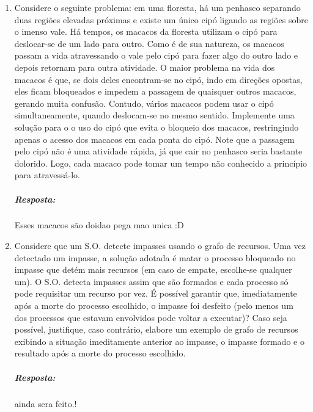 \documentclass[12pt]{article}
\begin{document}
\begin{enumerate}
 
\item
Considere o seguinte problema: em uma floresta, há um penhasco
separando duas regiões elevadas próximas e existe um único cipó
ligando as regiões sobre o imenso vale. Há tempos, os macacos da
floresta utilizam o cipó para deslocar-se de um lado para outro. Como
é de sua natureza, os macacos passam a vida atravessando o vale pelo
cipó para fazer algo do outro lado e depois retornam para outra
atividade. O maior problema na vida dos macacos é que, se dois deles
encontram-se no cipó, indo em direções opostas, eles ficam bloqueados
e impedem a passagem de quaisquer outros macacos, gerando muita
confusão. Contudo, vários macacos podem usar o cipó simultaneamente,
quando deslocam-se no mesmo sentido. Implemente uma solução para o o
uso do cipó que evita o bloqueio dos macacos, restringindo apenas o
acesso dos macacos em cada ponta do cipó. Note que a passagem pelo
cipó não é uma atividade rápida, já que cair no penhasco seria
bastante dolorido. Logo, cada macaco pode tomar um tempo não conhecido
a princípio para atravessá-lo.
 \subparagraph{Resposta:}
 
 Esses macacos são doidao pega mao unica :D
\item
Considere que um S.O. detecte impasses usando o grafo de recursos. Uma
vez detectado um impasse, a solução adotada é matar o processo
bloqueado no impasse que detém mais recursos (em caso de empate,
escolhe-se qualquer um). O S.O. detecta impasses assim que são
formados e cada processo só pode requisitar um recurso por vez. É
possível garantir que, imediatamente após a morte do processo
escolhido, o impasse foi desfeito (pelo menos um dos processos que
estavam envolvidos pode voltar a executar)? Caso seja possível,
justifique, caso contrário, elabore um exemplo de grafo de recursos
exibindo a situação imeditamente anterior ao impasse, o impasse
formado e o resultado após a morte do processo escolhido.
 \subparagraph{Resposta:}
	 ainda sera feito.!
\end{enumerate}
\end{document}

